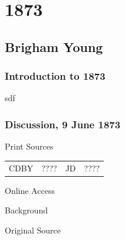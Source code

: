 \section{1873}

	\subsection{Brigham Young}
		\label{EMS-1873-BY}

		\subsubsection{Introduction to 1873}
		
			sdf
			
		\subsubsection{Discussion, 9 June 1873}
			\label{EMS-1873-BY-9-JUN-1873}
			
			\begin{description}
					\item[Print Sources]
				\end{description}

					\begin{tabular}{p{0.5in}p{1in}p{0.5in}p{1in}}
					CDBY	& ????		& JD 		& ???? \\
					\end{tabular}
				
				\begin{description}
					\item[Online Access] %
				\end{description}
				
				\begin{description}
					\item[Background]
				\end{description}
				
					\phantom{.}
				
				\begin{description}
					\item[Original Source]
				\end{description}
				
